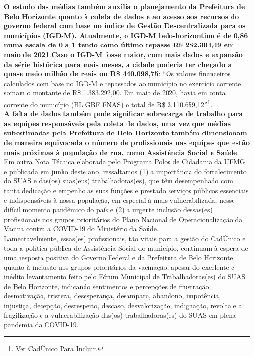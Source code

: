 \documentclass[12pt]{article}
\begin{document}
\textbf{O estudo das médias também auxilia o planejamento da Prefeitura de Belo Horizonte quanto à coleta de dados e ao acesso aos recursos do governo federal com base no índice de Gestão Descentralizada para os municípios (IGD-M). Atualmente, o IGD-M belo-horizontino é de 0,86 numa escala de 0 a 1 tendo como último repasse R\$ 282.304,49 em maio de 2021}.\textbf{Caso o IGD-M fosse maior, com mais dados e expansão da série histórica para mais meses, a cidade poderia ter chegado a quase meio milhão de reais ou R\$ 440.098,75}: ``Os valores financeiros calculados com base no IGD-M e repassados ao município no exercício corrente somam o montante de R\$ 1.383.292,00. Em maio de 2020, havia em conta corrente do município (BL GBF FNAS) o total de R\$ 3.110.659,12''\footnote{Ver \href{https://aplicacoes.mds.gov.br/sagirmps/bolsafamilia/relatorio-resumido.html}{CadÚnico Para Incluir}.}.\\

\textbf{A falta de dados também pode significar sobrecarga de trabalho para as equipes responsáveis pela coleta de dados, uma vez que médias subestimadas pela Prefeitura de Belo Horizonte também dimensionam de maneira equivocada o número de profissionais nas equipes que estão mais próximas à população de rua, como Assistência Social e Saúde}.\\ 

Em outra \href{https://polos.direito.ufmg.br/wp-content/uploads/2021/09/Nota-Tecnica-Sistema-Unico-de-Assistencia-Social-SUAS-BH.pdf}{Nota Técnica elaborada pelo Programa Polos de Cidadania da UFMG} e publicada em junho deste ano, ressaltamos (1) a importância do fortalecimento do SUAS e das(os) suas(eus) trabalhadoras(es), que têm desempenhado com tanta dedicação e empenho as suas funções e prestado serviços públicos essenciais e indispensáveis à nossa população, em especial à mais vulnerabilizada, nesse difícil momento pandêmico do país e (2) a urgente inclusão dessas(es) profissionais nos grupos prioritários do Plano Nacional de Operacionalização da Vacina contra a COVID-19 do Ministério da Saúde.\\

Lamentavelmente, essas(es) profissionais, tão vitais para a gestão do CadÚnico e toda a política pública de Assistência Social do município, continuam à espera de uma resposta positiva do Governo Federal e da Prefeitura de Belo Horizonte quanto à inclusão nos grupos prioritários da vacinação, apesar do excelente e inédito levantamento feito pelo Fórum Municipal de Trabalhadoras(es) do SUAS de Belo Horizonte, indicando sentimentos e percepções de frustração, desmotivação, tristeza, desesperança, desamparo, abandono, impotência, injustiça, decepção, desrespeito, descaso, desvalorização, indignação, revolta e a fragilização e a vulnerabilização das(os) trabalhadoras(es) do SUAS em plena pandemia da COVID-19.\\
\end{document}
